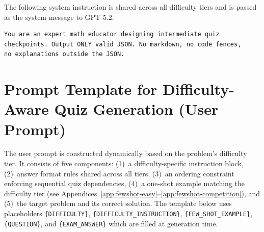\documentclass[12pt]{report}
\begin{document}
The following system instruction is shared across all difficulty tiers and is passed as the system message to GPT-5.2.

\begin{lstlisting}
You are an expert math educator designing intermediate quiz
checkpoints. Output ONLY valid JSON. No markdown, no code fences,
no explanations outside the JSON.
\end{lstlisting}

\section{Prompt Template for Difficulty-Aware Quiz Generation (User Prompt)}
\label{app:quiz-gen-v2-user}

The user prompt is constructed dynamically based on the problem's difficulty tier. It consists of five components: (1)~a difficulty-specific instruction block, (2)~answer format rules shared across all tiers, (3)~an ordering constraint enforcing sequential quiz dependencies, (4)~a one-shot example matching the difficulty tier (see Appendices~\ref{app:fewshot-easy}--\ref{app:fewshot-competition}), and (5)~the target problem and its correct solution. The template below uses placeholders \texttt{\{DIFFICULTY\}}, \texttt{\{DIFFICULTY\_INSTRUCTION\}}, \texttt{\{FEW\_SHOT\_EXAMPLE\}}, \texttt{\{QUESTION\}}, and \texttt{\{EXAM\_ANSWER\}} which are filled at generation time.
\end{document}
